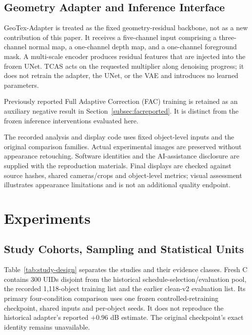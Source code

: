 \documentclass[times,twocolumn,final]{elsarticle}
\begin{document}
\subsection{Geometry Adapter and Inference Interface}
\label{subsec:adapterimpl}

GeoTex-Adapter is treated as the fixed geometry-residual backbone, not as a new contribution of this paper. It receives a five-channel input comprising a three-channel normal map, a one-channel depth map, and a one-channel foreground mask. A multi-scale encoder produces residual features that are injected into the frozen UNet. TCAS acts on the requested multiplier along denoising progress; it does not retrain the adapter, the UNet, or the VAE and introduces no learned parameters.

Previously reported Full Adaptive Correction (FAC) training is retained as an auxiliary negative result in Section~\ref{subsec:facreported}. It is distinct from the frozen inference interventions evaluated here.

The recorded analysis and display code uses fixed object-level inputs and the original comparison families. Actual experimental images are preserved without appearance retouching. Software identities and the AI-assistance disclosure are supplied with the reproduction materials. Final displays are checked against source hashes, shared cameras/crops and object-level metrics; visual assessment illustrates appearance limitations and is not an additional quality endpoint.

\section{Experiments}
\label{sec:experiments}

\subsection{Study Cohorts, Sampling and Statistical Units}
\label{subsec:setup}

Table~\ref{tab:study-design} separates the studies and their evidence classes. Fresh C contains 300 UIDs disjoint from the historical schedule-selection/evaluation pool, the recorded 1,118-object training list and the earlier clean-v2 evaluation list. Its primary four-condition comparison uses one frozen controlled-retraining checkpoint, shared inputs and per-object seeds. It does not reproduce the historical adapter's reported $+0.96$ dB estimate. The original checkpoint's exact identity remains unavailable.
\end{document}
